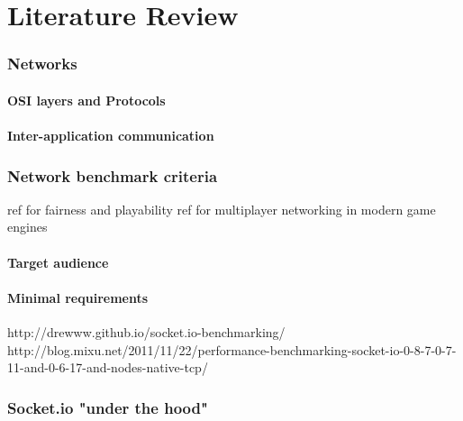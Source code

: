 \documentclass[12pt]{article}
\begin{document}
\pagebreak
\part{Literature Review}
\pagebreak

\section{Networks}
\subsection{OSI layers and Protocols}
\subsection{Inter-application communication}

\section{Network benchmark criteria}
ref for fairness and playability \cite{Fairness_and_Playability}
ref for multiplayer networking in modern game engines \cite{Multiplayer_Networking_modern_engine}

\subsection{Target audience}

\subsection{Minimal requirements}
http://drewww.github.io/socket.io-benchmarking/
\\http://blog.mixu.net/2011/11/22/performance-benchmarking-socket-io-0-8-7-0-7-11-and-0-6-17-and-nodes-native-tcp/

\section{Socket.io "under the hood"}
\end{document}
